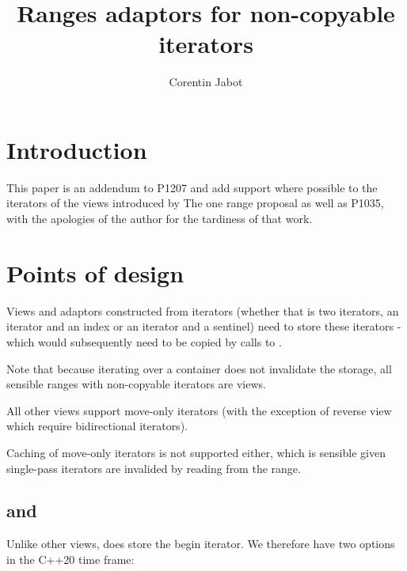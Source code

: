 \documentclass{wg21}
\title{Ranges adaptors for non-copyable iterators}
\author{Corentin Jabot}{corentin.jabot@gmail.com}
\begin{document}
\maketitle


\hypertarget{introduction}{%
	\section{Introduction}\label{introduction}}


This paper is an addendum to P1207 and add support where possible to the iterators of the views introduced by
The one range proposal as well as P1035, with the apologies of the author for the tardiness of that work.

\section{Points of design}

Views and adaptors constructed from iterators (whether that is two iterators, an iterator and an index or an iterator and a sentinel) need to store these iterators - which would subsequently need to be copied by calls to .

Note that because iterating over a container does not invalidate the storage, all sensible ranges with non-copyable iterators are views.


All other views support move-only iterators (with the exception of reverse view which require bidirectional iterators).

Caching of move-only iterators is not supported either, which is sensible given single-pass iterators are invalided by reading from the range.
\newpage
\subsection{ and }

Unlike other views,  does store the begin iterator.
We therefore have two options in the C++20 time frame:
\end{document}
